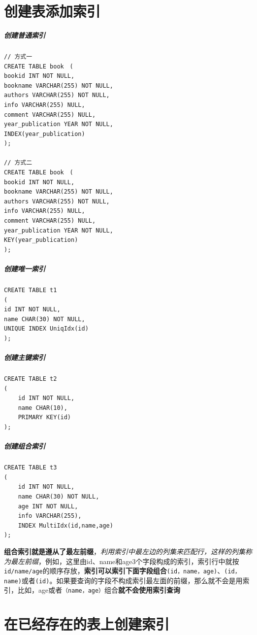 \documentclass[UTF8,a4paper,12pt]{ctexbook}
\begin{document}
	\section{创建表添加索引}
		\subparagraph{创建普通索引}
			\begin{lstlisting}
// 方式一
CREATE TABLE book　(
bookid INT NOT NULL,　　　　　　　　　　　　　　　
bookname VARCHAR(255) NOT NULL,　　　　　　　　　　 
authors VARCHAR(255) NOT NULL,　　　　　　　　　　　 
info VARCHAR(255) NULL,　　　　　　　　　　　　　　　　
comment VARCHAR(255) NULL,　　　　　　　　　　　　　
year_publication YEAR NOT NULL,　　　　　　　　　　　
INDEX(year_publication)　　　　　　　　　　　　　　　
);

// 方式二
CREATE TABLE book　(
bookid INT NOT NULL,　　　　　　　　　　　　　　　
bookname VARCHAR(255) NOT NULL,　　　　　　　　　　 
authors VARCHAR(255) NOT NULL,　　　　　　　　　　　 
info VARCHAR(255) NULL,　　　　　　　　　　　　　　　　
comment VARCHAR(255) NULL,　　　　　　　　　　　　　
year_publication YEAR NOT NULL,　　　　　　　　　　　
KEY(year_publication)　　　　　　　　　　　　　　　
);　　　　　　　　　　　　　　　　　　　　　　　　　　　　　　　　　　　　　　　　　　　　　　　　
			\end{lstlisting}
		\subparagraph{创建唯一索引}
			\begin{lstlisting}
CREATE TABLE t1
(
id INT NOT NULL,
name CHAR(30) NOT NULL,
UNIQUE INDEX UniqIdx(id)
);　
			\end{lstlisting}
		\subparagraph{创建主键索引}
			\begin{lstlisting}
CREATE TABLE t2
(
	id INT NOT NULL,
	name CHAR(10),
	PRIMARY KEY(id)
);
			\end{lstlisting}
		
		\subparagraph{创建组合索引}
			\begin{lstlisting}
CREATE TABLE t3
(
	id INT NOT NULL,
	name CHAR(30) NOT NULL,
	age INT NOT NULL,
	info VARCHAR(255),
	INDEX MultiIdx(id,name,age)
);
			\end{lstlisting}
			
			\textbf{组合索引就是遵从了最左前缀}，\textit{利用索引中最左边的列集来匹配行，这样的列集称为最左前缀}，例如，这里由id、name和age3个字段构成的索引，索引行中就按\verb|id/name/age|的顺序存放，\textbf{索引可以索引下面字段组合}\verb|(id，name，age)|、\verb|(id，name)|或者\verb|(id)|。如果要查询的字段不构成索引最左面的前缀，那么就不会是用索引，比如，age或者\verb|（name，age）|组合\textbf{就不会使用索引查询}
			
	
	\section{在已经存在的表上创建索引}
	
\end{document}
